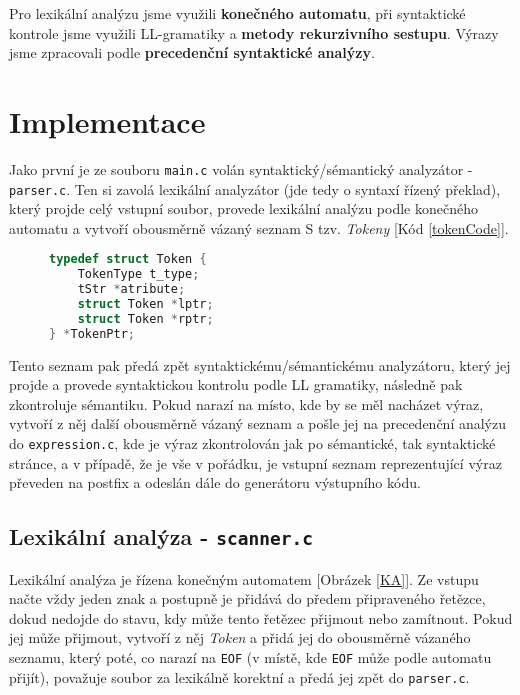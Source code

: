 \documentclass[czech,a4paper,12pt]{article}[]
\begin{document}
\smallskip
Pro lexikální analýzu jsme využili \textbf{konečného automatu}, při syntaktické kontrole jsme využili LL-gramatiky a \textbf{metody rekurzivního sestupu}. Výrazy jsme zpracovali podle \textbf{precedenční syntaktické analýzy}.


\section{Implementace}
Jako první je ze souboru \texttt{main.c} volán syntaktický/sémantický analyzátor - \texttt{parser.c}. Ten si zavolá lexikální analyzátor (jde tedy o syntaxí řízený překlad), který projde celý vstupní soubor, provede lexikální analýzu podle konečného automatu a vytvoří obousměrně vázaný seznam S tzv. \emph{Tokeny} [Kód \ref{tokenCode}]. 

\begin{figure}[h!]
    \begin{lstlisting}[language=C, caption={Implementace struktury tokenu},label=tokenCode, captionpos=b]
typedef struct Token {
    TokenType t_type;
    tStr *atribute;
    struct Token *lptr;
    struct Token *rptr;
} *TokenPtr;
    \end{lstlisting}
\end{figure}

Tento seznam pak předá zpět syntaktickému/sémantickému analyzátoru, který jej projde a provede syntaktickou kontrolu podle LL gramatiky, následně pak zkontroluje sémantiku. Pokud narazí na místo, kde by se měl nacházet výraz, vytvoří z něj další obousměrně vázaný seznam a pošle jej na precedenční analýzu do \texttt{expression.c}, kde je výraz zkontrolován jak po sémantické, tak syntaktické stránce, a v případě, že je vše v pořádku, je vstupní seznam reprezentující výraz převeden na postfix a odeslán dále do generátoru výstupního kódu.

\newpage


\subsection{Lexikální analýza - \texttt{scanner.c}}
Lexikální analýza je řízena konečným automatem [Obrázek \ref{KA}]. Ze vstupu načte vždy jeden znak a postupně je přidává do předem připraveného řetězce, dokud nedojde do stavu, kdy může tento řetězec přijmout nebo zamítnout. Pokud jej může přijmout, vytvoří z něj \emph{Token} a přidá jej do obousměrně vázaného seznamu, který poté, co narazí na \texttt{EOF} (v místě, kde \texttt{EOF} může podle automatu přijít), považuje soubor za lexikálně korektní a předá jej zpět do \texttt{parser.c}.
\end{document}
